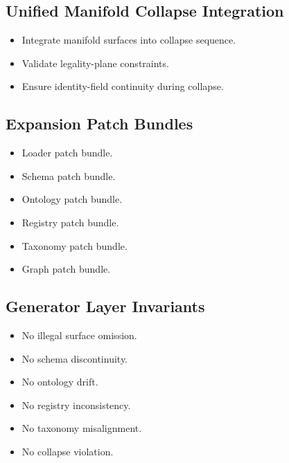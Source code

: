 \subsection{Unified Manifold Collapse Integration}
\begin{itemize}
    \item Integrate manifold surfaces into collapse sequence.
    \item Validate legality-plane constraints.
    \item Ensure identity-field continuity during collapse.
\end{itemize}

\subsection{Expansion Patch Bundles}
\begin{itemize}
    \item Loader patch bundle.
    \item Schema patch bundle.
    \item Ontology patch bundle.
    \item Registry patch bundle.
    \item Taxonomy patch bundle.
    \item Graph patch bundle.
\end{itemize}

\subsection{Generator Layer Invariants}
\begin{itemize}
    \item No illegal surface omission.
    \item No schema discontinuity.
    \item No ontology drift.
    \item No registry inconsistency.
    \item No taxonomy misalignment.
    \item No collapse violation.
\end{itemize}
